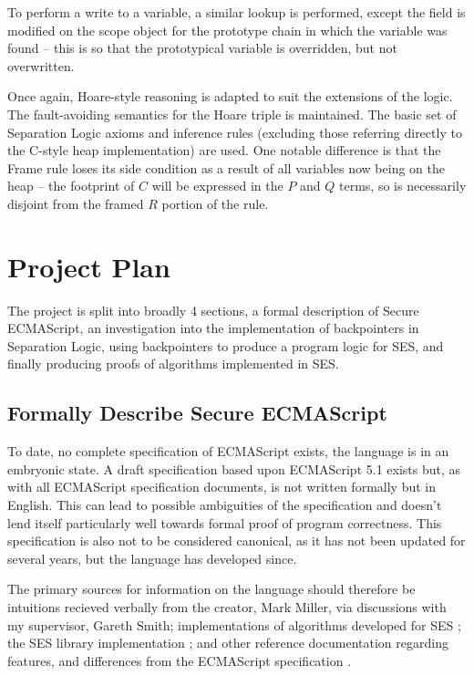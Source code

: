\documentclass[a4paper]{report}
\begin{document}
  To perform a write to a variable, a similar lookup is performed, except the
  field is modified on the scope object for the prototype chain in which the
  variable was found -- this is so that the prototypical variable is overridden,
  but not overwritten.

  Once again, Hoare-style reasoning is adapted to suit the extensions of the
  logic. The fault-avoiding semantics for the Hoare triple is maintained. The
  basic set of Separation Logic axioms and inference rules (excluding those
  referring directly to the C-style heap implementation) are used. One notable
  difference is that the Frame rule loses its side condition as a result of all
  variables now being on the heap -- the footprint of $C$ will be expressed in
  the $P$ and $Q$ terms, so is necessarily disjoint from the framed $R$ portion of
  the rule.

\chapter{Project Plan}
  The project is split into broadly 4 sections, a formal description of Secure
  ECMAScript, an investigation into the implementation of backpointers in
  Separation Logic, using backpointers to produce a program logic for SES, and
  finally producing proofs of algorithms implemented in SES.

  \section{Formally Describe Secure ECMAScript}
  To date, no complete specification of ECMAScript exists, the language is in an
  embryonic state. A draft specification \cite{ses-spec} based upon ECMAScript 5.1 exists but,
  as with all ECMAScript specification documents, is not written formally but in
  English. This can lead to possible ambiguities of the specification and
  doesn't lend itself particularly well towards formal proof of program
  correctness. This specification is also not to be considered canonical, as it
  has not been updated for several years, but the language has developed since.

  The primary sources for information on the language should therefore be
  intuitions recieved verbally from the creator, Mark Miller, via discussions
  with my supervisor, Gareth Smith; implementations of algorithms developed for
  SES \cite{contract-host-algo}; the SES library implementation \cite{ses-impl};
  and other reference documentation regarding features, and differences from the
  ECMAScript specification \cite{securable-es,ses-diffs,ses-caja-diffs}.
\end{document}
